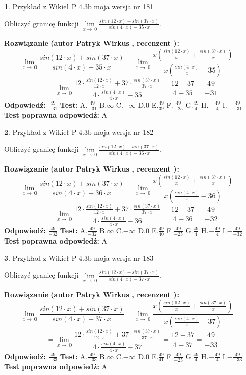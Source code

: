 \documentclass[12pt, a4paper]{article}
\theoremstyle{definition} %
\newtheorem{zad}{}
\newcommand{\zadStart}[1]{\begin{zad}#1\newline}
\newcommand{\zadStop}{\end{zad}}
\newcommand{\rozwStart}[2]{\noindent \textbf{Rozwiązanie (autor #1 , recenzent #2): }\newline}
\newcommand{\rozwStop}{\newline}
\newcommand{\odpStart}{\noindent \textbf{Odpowiedź:}\newline}
\newcommand{\odpStop}{\newline}
\newcommand{\testStart}{\noindent \textbf{Test:}\newline}
\newcommand{\testStop}{\newline}
\newcommand{\kluczStart}{\noindent \textbf{Test poprawna odpowiedź:}\newline}
\newcommand{\kluczStop}{\newline}
\begin{document}
\zadStart{Przykład z Wikieł P 4.3b moja wersja nr 181}


Obliczyć granicę funkcji $\lim\limits_{x\to\ 0}\frac{sin(12 \cdot x)+sin(37 \cdot x)}{sin(4 \cdot x)-35 \cdot x}$.
\zadStop
\rozwStart{Patryk Wirkus}{}
$$\lim\limits_{x\to\ 0}\frac{sin(12 \cdot x)+sin(37 \cdot x)}{sin(4 \cdot x)-35 \cdot x}=\lim\limits_{x\to\ 0}\frac{x(\frac{sin(12 \cdot x)}{x}+\frac{sin(37 \cdot x)}{x})}{x(\frac{sin(4 \cdot x)}{x}-35)}=$$
$$=\lim\limits_{x\to\ 0}\frac{12 \cdot \frac{sin(12 \cdot x)}{12 \cdot x}+37 \cdot \frac{sin(37 \cdot x)}{37 \cdot x}}{4 \cdot \frac{sin(4 \cdot x)}{4 \cdot x}-35}=\frac{12+37}{4-35} = \frac{49}{-31}$$
\rozwStop
\odpStart
$\frac{49}{-31}$
\odpStop
\testStart
A.$\frac{49}{-31}$
B.$\infty$
C.$-\infty$
D.$0$
E.$\frac{49}{39}$
F.$\frac{49}{-25}$
G.$\frac{49}{4}$
H.$-\frac{49}{4}$
I.$-\frac{49}{-31}$
\testStop
\kluczStart
A
\kluczStop



\zadStart{Przykład z Wikieł P 4.3b moja wersja nr 182}


Obliczyć granicę funkcji $\lim\limits_{x\to\ 0}\frac{sin(12 \cdot x)+sin(37 \cdot x)}{sin(4 \cdot x)-36 \cdot x}$.
\zadStop
\rozwStart{Patryk Wirkus}{}
$$\lim\limits_{x\to\ 0}\frac{sin(12 \cdot x)+sin(37 \cdot x)}{sin(4 \cdot x)-36 \cdot x}=\lim\limits_{x\to\ 0}\frac{x(\frac{sin(12 \cdot x)}{x}+\frac{sin(37 \cdot x)}{x})}{x(\frac{sin(4 \cdot x)}{x}-36)}=$$
$$=\lim\limits_{x\to\ 0}\frac{12 \cdot \frac{sin(12 \cdot x)}{12 \cdot x}+37 \cdot \frac{sin(37 \cdot x)}{37 \cdot x}}{4 \cdot \frac{sin(4 \cdot x)}{4 \cdot x}-36}=\frac{12+37}{4-36} = \frac{49}{-32}$$
\rozwStop
\odpStart
$\frac{49}{-32}$
\odpStop
\testStart
A.$\frac{49}{-32}$
B.$\infty$
C.$-\infty$
D.$0$
E.$\frac{49}{40}$
F.$\frac{49}{-25}$
G.$\frac{49}{4}$
H.$-\frac{49}{4}$
I.$-\frac{49}{-32}$
\testStop
\kluczStart
A
\kluczStop



\zadStart{Przykład z Wikieł P 4.3b moja wersja nr 183}


Obliczyć granicę funkcji $\lim\limits_{x\to\ 0}\frac{sin(12 \cdot x)+sin(37 \cdot x)}{sin(4 \cdot x)-37 \cdot x}$.
\zadStop
\rozwStart{Patryk Wirkus}{}
$$\lim\limits_{x\to\ 0}\frac{sin(12 \cdot x)+sin(37 \cdot x)}{sin(4 \cdot x)-37 \cdot x}=\lim\limits_{x\to\ 0}\frac{x(\frac{sin(12 \cdot x)}{x}+\frac{sin(37 \cdot x)}{x})}{x(\frac{sin(4 \cdot x)}{x}-37)}=$$
$$=\lim\limits_{x\to\ 0}\frac{12 \cdot \frac{sin(12 \cdot x)}{12 \cdot x}+37 \cdot \frac{sin(37 \cdot x)}{37 \cdot x}}{4 \cdot \frac{sin(4 \cdot x)}{4 \cdot x}-37}=\frac{12+37}{4-37} = \frac{49}{-33}$$
\rozwStop
\odpStart
$\frac{49}{-33}$
\odpStop
\testStart
A.$\frac{49}{-33}$
B.$\infty$
C.$-\infty$
D.$0$
E.$\frac{49}{41}$
F.$\frac{49}{-25}$
G.$\frac{49}{4}$
H.$-\frac{49}{4}$
I.$-\frac{49}{-33}$
\testStop
\kluczStart
A
\kluczStop
\end{document}
